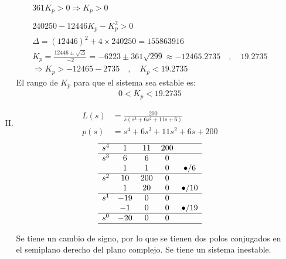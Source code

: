 \begin{ejercicio}
\begin{enumerate}
\begin{enumerate}[I.]
        \begin{align*}
          361K_p > 0 \Rightarrow K_p > 0
          \\\\
          240250 - 12446 K_p - K_p^2 > 0
          \\
          \Delta = (12446)^2 + 4\times 240250 = 155863916
          \\
          K_p = \frac{12446 \pm \sqrt{\Delta}}{-2} = -6223 \pm 361 \sqrt{299} \approx -12465.2735 \quad,\quad 19.2735
          \\
          \Rightarrow K_p > -12465-2735 \quad,\quad K_p < 19.2735
        \end{align*}
        El rango de $K_p$ para que el sistema sea estable es:
        \begin{align*}
          0 < K_p < 19.2735
        \end{align*}

      \item 
        \begin{align*}
          L(s) &= \frac{200}{s(s^3+6s^2+11s+6)}
          \\
          p(s) &= s^4 + 6s^3 + 11s^2 + 6s + 200
        \end{align*}
        \[
          \begin{matrix}
          \hline
          s^4 & 1 & 11 & 200
          \\\hline
          s^3 & 6 & 6 & 0
          \\
           & 1 & 1 & 0 & \bullet / 6
          \\\hline
          s^2 & 10 & 200 & 0
          \\
          & 1 & 20 & 0 & \bullet / 10
          \\\hline
          s^1 & -19 & 0 & 0
          \\
           & -1 & 0 & 0 & \bullet / 19
          \\\hline
          s^0 & -20 & 0 & 0
          \\\hline
          \end{matrix}
        \]

        Se tiene un cambio de signo, por lo que se tienen dos polos conjugados en el semiplano derecho del plano complejo. Se tiene un sistema inestable.



\end{enumerate}
\end{enumerate}
\end{ejercicio}
